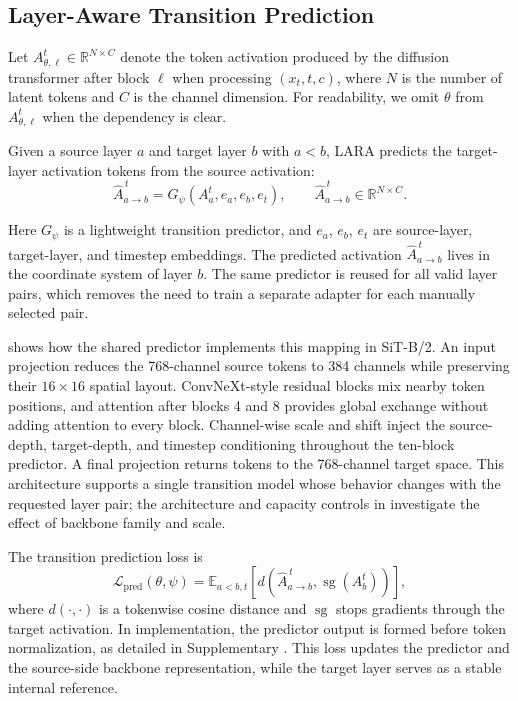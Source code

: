 \subsection{Layer-Aware Transition Prediction}
\label{sec:predictor}

Let $A_{\theta,\ell}^t\in\mathbb{R}^{N\times C}$ denote the token activation produced by the diffusion transformer after block $\ell$ when processing $(x_t,t,c)$, where $N$ is the number of latent tokens and $C$ is the channel dimension. For readability, we omit $\theta$ from $A_{\theta,\ell}^t$ when the dependency is clear.

Given a source layer $a$ and target layer $b$ with $a<b$, LARA predicts the target-layer activation tokens from the source activation:
\begin{equation}
\widehat A_{a\to b}^{\,t}
=
G_\psi(A_a^t,e_a,e_b,e_t),
\qquad
\widehat A_{a\to b}^{\,t}\in\mathbb{R}^{N\times C}.
\label{eq:realign_predictor}
\end{equation}

Here $G_\psi$ is a lightweight transition predictor, and $e_a$, $e_b$, $e_t$ are source-layer, target-layer, and timestep embeddings. The predicted activation $\widehat A_{a\to b}^{\,t}$ lives in the coordinate system of layer $b$. The same predictor is reused for all valid layer pairs, which removes the need to train a separate adapter for each manually selected pair.

 shows how the shared predictor implements this mapping in SiT-B/2. An input projection reduces the 768-channel source tokens to 384 channels while preserving their $16\times16$ spatial layout. ConvNeXt-style residual blocks mix nearby token positions, and attention after blocks 4 and 8 provides global exchange without adding attention to every block. Channel-wise scale and shift inject the source-depth, target-depth, and timestep conditioning throughout the ten-block predictor. A final projection returns tokens to the 768-channel target space. This architecture supports a single transition model whose behavior changes with the requested layer pair; the architecture and capacity controls in  investigate the effect of backbone family and scale.

The transition prediction loss is
\begin{equation}
\mathcal{L}_{\mathrm{pred}}(\theta,\psi)
=
\mathbb{E}_{a<b,t}
\left[
d\left(
\widehat A_{a\to b}^{\,t},
\operatorname{sg}(A_b^t)
\right)
\right],
\label{eq:align_loss}
\end{equation}
where $d(\cdot,\cdot)$ is a tokenwise cosine distance and $\operatorname{sg}$ stops gradients through the target activation. In implementation, the predictor output is formed before token normalization, as detailed in Supplementary . This loss updates the predictor and the source-side backbone representation, while the target layer serves as a stable internal reference.

